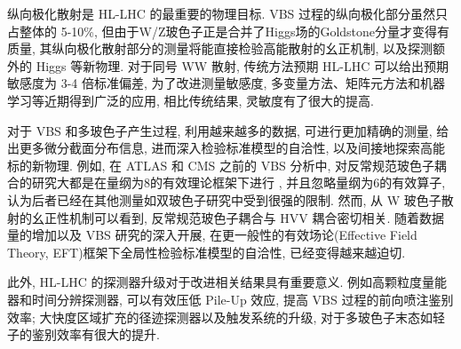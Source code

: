 \documentclass{SCIS2020cn}
\begin{document}
纵向极化散射是 HL-LHC 的最重要的物理目标. VBS 过程的纵向极化部分虽然只占整体的 5-10\%, 但由于W/Z玻色子正是合并了Higgs场的Goldstone分量才变得有质量, 其纵向极化散射部分的测量将能直接检验高能散射的幺正机制, 以及探测额外的 Higgs 等新物理. 对于同号 WW 散射, 传统方法预期 HL-LHC 可以给出预期敏感度为 3-4 倍标准偏差, 为了改进测量敏感度, 多变量方法、矩阵元方法和机器学习等近期得到广泛的应用, 相比传统结果, 灵敏度有了很大的提高.

对于 VBS 和多玻色子产生过程, 利用越来越多的数据, 可进行更加精确的测量, 给出更多微分截面分布信息, 进而深入检验标准模型的自洽性, 以及间接地探索高能标的新物理. 例如, 在 ATLAS 和 CMS 之前的 VBS 分析中, 对反常规范玻色子耦合的研究大都是在量纲为8的有效理论框架下进行 , 并且忽略量纲为6的有效算子, 认为后者已经在其他测量如双玻色子研究中受到很强的限制. 然而, 从 W 玻色子散射的幺正性机制可以看到, 反常规范玻色子耦合与 HVV 耦合密切相关. 随着数据量的增加以及 VBS 研究的深入开展, 在更一般性的有效场论(Effective Field Theory, EFT)框架下全局性检验标准模型的自洽性, 已经变得越来越迫切.

此外, HL-LHC 的探测器升级对于改进相关结果具有重要意义. 例如高颗粒度量能器和时间分辨探测器, 可以有效压低 Pile-Up 效应, 提高 VBS 过程的前向喷注鉴别效率; 大快度区域扩充的径迹探测器以及触发系统的升级, 对于多玻色子末态如轻子的鉴别效率有很大的提升.

\newpage
{}

\end{document}
